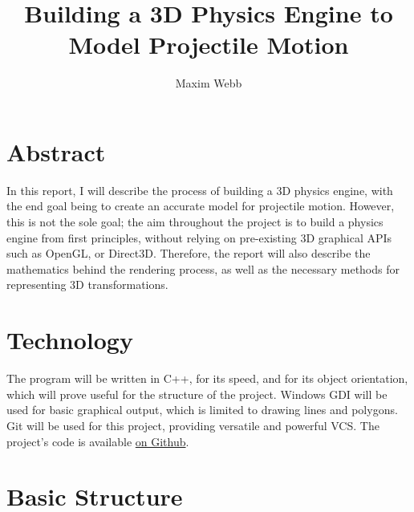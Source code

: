 \documentclass{article}
\title{
	\Huge
	{Building a 3D Physics Engine to Model Projectile Motion}\\
}
\author{Maxim Webb}
\begin{document}
\maketitle

\newpage

\section{Abstract}
In this report, I will describe the process of building a 3D physics engine, with the end goal being to create an accurate model for projectile motion.
\newline
\newline
However, this is not the sole goal; the aim throughout the project is to build a physics engine from first principles, without relying on pre-existing 3D graphical APIs such as OpenGL, or Direct3D. Therefore, the report will also describe the mathematics behind the rendering process, as well as the necessary methods for representing 3D transformations.
\newline

\section{Technology}
The program will be written in C++, for its speed, and for its object orientation, which will prove useful for the structure of the project.
\newline
\newline
Windows GDI will be used for basic graphical output, which is limited to drawing lines and polygons. 
\newline
\newline
Git will be used for this project, providing versatile and powerful VCS. The project's code is available 
\href{https://github.com/maximwebb/3D-engine}{\color{blue} on Github}\color{black}.
\newline
\newline

\newpage

\section{Basic Structure}
\end{document}
